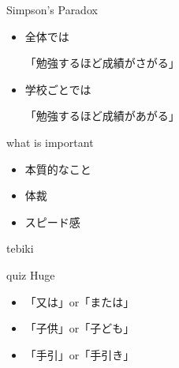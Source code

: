 \documentclass[
  ignorenonframetext,
]{beamer}
\providecommand{\tightlist}{%
  \setlength{\itemsep}{0pt}\setlength{\parskip}{0pt}}
\begin{document}
\begin{frame}{Simpson's Paradox}
\protect\hypertarget{simpsons-paradox}{}
\LARGE

\begin{itemize}[<+->]
\tightlist
\item
  \textbullet{}\hspace{2pt}全体では

  \par

  「勉強するほど成績がさがる」 \bigskip
\item
  \textbullet{}\hspace{2pt}学校ごとでは

  \par

  「勉強するほど成績があがる」
\end{itemize}

\normalsize
\end{frame}

\begin{frame}{what is important}
\protect\hypertarget{what-is-important}{}
\Huge

\begin{itemize}[<+->]
\tightlist
\item
  \textbullet{}\hspace{2pt}本質的なこと \bigskip
\item
  \textbullet{}\hspace{2pt}体裁 \bigskip
\item
  \textbullet{}\hspace{2pt}スピード感
\end{itemize}
\end{frame}

\begin{frame}{tebiki}
\protect\hypertarget{tebiki}{}
\vspace*{-20pt}
\end{frame}

\begin{frame}{quiz}
\protect\hypertarget{quiz}{}
Huge

\begin{itemize}[<+->]
\tightlist
\item
  「又は」or「または」 \bigskip
\item
  「子供」or「子ども」 \bigskip
\item
  「手引」or「手引き」
\end{itemize}
\end{frame}
\end{document}
